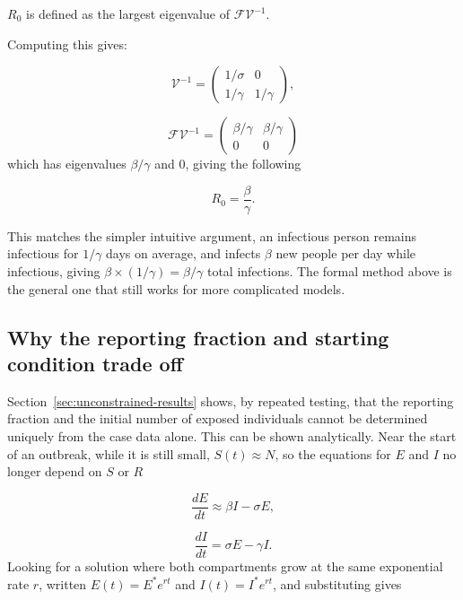 \documentclass[journal]{IEEEtran}
\begin{document}
$R_0$ is defined as the largest eigenvalue of $\mathcal{F}\mathcal{V}^{-1}$.

Computing this gives:

\begin{equation}
\mathcal{V}^{-1} = \begin{pmatrix} 1/\sigma & 0 \\ 1/\gamma & 1/\gamma \end{pmatrix},
\end{equation}

\begin{equation}
\mathcal{F}\mathcal{V}^{-1} = \begin{pmatrix} \beta/\gamma & \beta/\gamma \\ 0 & 0 \end{pmatrix}
\end{equation}
which has eigenvalues $\beta/\gamma$ and $0$, giving the following

\begin{equation}
R_0 = \frac{\beta}{\gamma}.
\end{equation}

This matches the simpler intuitive argument, an infectious person remains infectious for $1/\gamma$ days on average, and infects $\beta$ new people per day while infectious, giving $\beta \times (1/\gamma) = \beta/\gamma$ total infections. The formal method above is the general one that still works for more complicated models.

\subsection{Why the reporting fraction and starting condition trade off}
\label{sec:growthrate}

Section~\ref{sec:unconstrained-results} shows, by repeated testing, that the reporting fraction and the initial number of exposed individuals cannot be determined uniquely from the case data alone. This can be shown analytically. Near the start of an outbreak, while it is still small, $S(t) \approx N$, so the equations for $E$ and $I$ no longer depend on $S$ or $R$

\begin{equation}
\frac{dE}{dt} \approx \beta I - \sigma E, 
\end{equation}

\begin{equation}
\frac{dI}{dt} = \sigma E - \gamma I.
\end{equation}
Looking for a solution where both compartments grow at the same exponential rate $r$, written $E(t) = E^\ast e^{rt}$ and $I(t) = I^\ast e^{rt}$, and substituting gives
\end{document}
